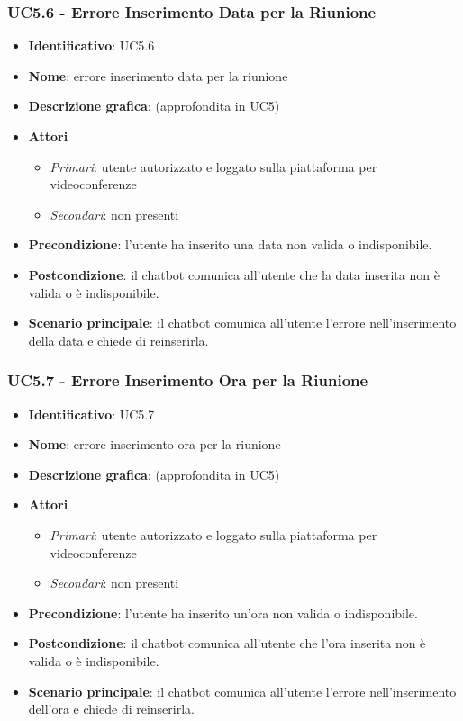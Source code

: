 \subsubsection{UC5.6 - Errore Inserimento Data per la Riunione}
\begin{itemize}
    \item \textbf{Identificativo}: UC5.6
    \item \textbf{Nome}: errore inserimento data per la riunione
    \item \textbf{Descrizione grafica}: (approfondita in UC5)
    \item \textbf{Attori}
 \begin{itemize} 
    \item \textit{Primari}: utente autorizzato e loggato sulla piattaforma per videoconferenze
    \item \textit{Secondari}: non presenti
 \end{itemize}
 \item \textbf{Precondizione}: l'utente ha inserito una data non valida o indisponibile.
 \item \textbf{Postcondizione}: il chatbot comunica all'utente che la data inserita non è valida o è indisponibile.
 \item \textbf{Scenario principale}: il chatbot comunica all'utente l'errore nell'inserimento della data e chiede di reinserirla.
\end{itemize}
\subsubsection{UC5.7 - Errore Inserimento Ora per la Riunione}
\begin{itemize}
    \item \textbf{Identificativo}: UC5.7
    \item \textbf{Nome}: errore inserimento ora per la riunione
    \item \textbf{Descrizione grafica}: (approfondita in UC5)
    \item \textbf{Attori}
 \begin{itemize} 
    \item \textit{Primari}: utente autorizzato e loggato sulla piattaforma per videoconferenze
    \item \textit{Secondari}: non presenti
 \end{itemize}
 \item \textbf{Precondizione}: l'utente ha inserito un'ora non valida o indisponibile.
 \item \textbf{Postcondizione}: il chatbot comunica all'utente che l'ora inserita non è valida o è indisponibile.
 \item \textbf{Scenario principale}: il chatbot comunica all'utente l'errore nell'inserimento dell'ora e chiede di reinserirla.
\end{itemize}
